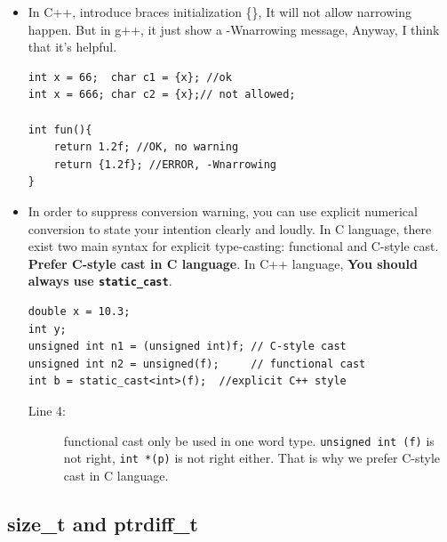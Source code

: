 \documentclass[a4paper,11pt,twoside]{book}
\begin{document}
\begin{itemize}
	\item In C++, introduce braces initialization \{\}, It will not allow narrowing happen. But in g++, it just show a -Wnarrowing message, Anyway, I think that it's helpful.
\begin{lstlisting}[numbers=none]
int x = 66;  char c1 = {x}; //ok	
int x = 666; char c2 = {x};// not allowed;

int fun(){
	return 1.2f; //OK, no warning
	return {1.2f}; //ERROR, -Wnarrowing
}
\end{lstlisting}
	
	\item In order to suppress conversion warning, you can use explicit numerical conversion to state your intention clearly and loudly. In C language, there exist two main syntax for explicit type-casting: functional and C-style cast.  \textbf{Prefer C-style cast in C language}. In C++ language, \textbf{You should always use \texttt{static\_cast}}.
	
\begin{lstlisting}[]
double x = 10.3;
int y;
unsigned int n1 = (unsigned int)f; // C-style cast
unsigned int n2 = unsigned(f);     // functional cast
int b = static_cast<int>(f);  //explicit C++ style
\end{lstlisting}
	\begin{description}
		\item[Line 4:] functional cast only be used in one word type. \texttt{unsigned int (f)} is not right, \texttt{int *(p)} is not right either. That is why we prefer C-style cast in C language.
	\end{description}
\end{itemize}

\subsection{size\_t and ptrdiff\_t}
\end{document}
